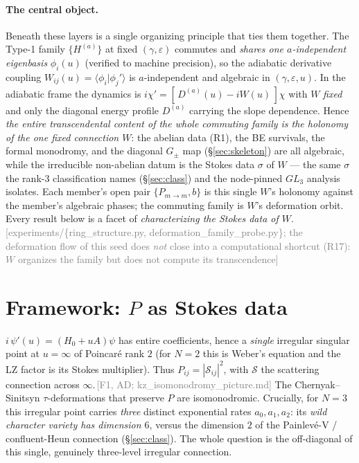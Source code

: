 \documentclass[aps,prd,reprint,nofootinbib]{revtex4-2}
\newcommand{\pnote}[1]{\textcolor{gray}{\footnotesize\,[#1]}}
\newcommand{\eps}{\varepsilon}
\newcommand{\Scat}{\mathcal{S}}   %
\newcommand{\Pmid}{P_{m\to m}}   %
\begin{document}
\paragraph*{The central object.} Beneath these layers is a single organizing principle that ties them
together. The Type-1 family $\{H^{(a)}\}$ at fixed $(\gamma,\eps)$ commutes and \emph{shares one
$a$-independent eigenbasis} $\phi_i(u)$ (verified to machine precision), so the adiabatic derivative
coupling $W_{ij}(u)=\langle\phi_i|\phi_j'\rangle$ is $a$-independent and algebraic in $(\gamma,\eps,u)$.
In the adiabatic frame the dynamics is $i\chi'=[\,D^{(a)}(u)-iW(u)\,]\chi$ with $W$ \emph{fixed} and only
the diagonal energy profile $D^{(a)}$ carrying the slope dependence. Hence \emph{the entire transcendental
content of the whole commuting family is the holonomy of the one fixed connection $W$}: the abelian data
(R1), the BE survivals, the formal monodromy, and the diagonal $G_\pm$ map (\S\ref{sec:skeleton}) are all
algebraic, while the irreducible non-abelian datum is the Stokes data $\sigma$ of $W$ --- the same
$\sigma$ the rank-3 classification names (\S\ref{sec:class}) and the node-pinned $GL_3$ analysis isolates.
Each member's open pair $\{\Pmid,b\}$ is this single $W$'s holonomy against the member's algebraic phases;
the commuting family is $W$'s deformation orbit. Every result below is a facet of \emph{characterizing the
Stokes data of $W$}.\pnote{experiments/\{ring\_structure.py, deformation\_family\_probe.py\}; the
deformation flow of this seed does \emph{not} close into a computational shortcut (R17): $W$ organizes
the family but does not compute its transcendence}

\section{Framework: $P$ as Stokes data}\label{sec:framework}
$i\,\psi'(u)=(H_0+uA)\psi$ has entire coefficients, hence a \emph{single} irregular singular point at
$u=\infty$ of Poincar\'e rank $2$ (for $N{=}2$ this is Weber's equation and the LZ factor is its
Stokes multiplier). Thus $P_{ij}=|\Scat_{ij}|^2$, with $\Scat$ the scattering connection across
$\infty$.\pnote{F1, AD; kz\_isomonodromy\_picture.md} The Chernyak--Sinitsyn $\tau$-deformations that
preserve $P$ are isomonodromic. Crucially, for $N{=}3$ this irregular point carries \emph{three}
distinct exponential rates $a_0,a_1,a_2$: its \emph{wild character variety has dimension $6$}, versus
the dimension $2$ of the Painlev\'e-V / confluent-Heun connection (\S\ref{sec:class}). The whole
question is the off-diagonal of this single, genuinely three-level irregular connection.
\end{document}
